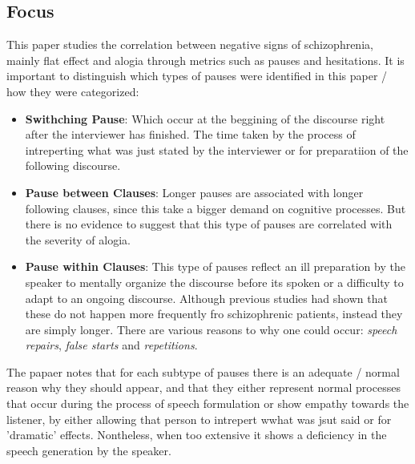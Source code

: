 \documentclass{Paper_Summary}
\begin{document}
\makepapertitle

\breakline

\begin{center}
    \section*{Focus}
\end{center}
    
This paper studies the correlation between negative signs of schizophrenia, mainly flat effect and alogia through metrics such as pauses and hesitations.
It is important to distinguish which types of pauses were identified in this paper / how they were categorized:
\begin{itemize}
    \item \textbf{Swithching Pause}: Which occur at the beggining of the discourse right after the interviewer has finished. The time taken by the process of intreperting what was just stated by the interviewer or for preparatiion of the following discourse.
    \item \textbf{Pause between Clauses}: Longer pauses are associated with longer following clauses, since this take a bigger demand on cognitive processes. But there is no evidence to suggest that this type of pauses are correlated with the severity of alogia.
    \item \textbf{Pause within Clauses}: This type of pauses reflect an ill preparation by the speaker to mentally organize the discourse before its spoken or a difficulty to adapt to an ongoing discourse. Although previous studies had shown that these do not happen more frequently fro schizophrenic patients, instead they are simply longer. There are various reasons to why one could occur: \emph{speech repairs}, \emph{false starts} and \emph{repetitions}.
\end{itemize}

The papaer notes that for each subtype of pauses there is an adequate / normal reason why they should appear, and that they either represent normal processes that occur during the process of speech formulation or show empathy towards the listener, by either allowing that person to intrepert wwhat was jsut said or for 'dramatic' effects. Nontheless, when too extensive it shows a deficiency in the speech generation by the speaker.

\breakline

\newpage
\end{document}
